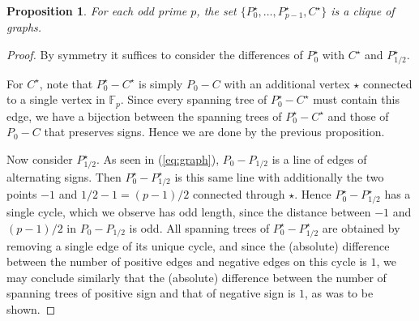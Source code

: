 \documentclass{amsart}
\theoremstyle{plain}
\newtheorem{proposition}[theorem]{Proposition}
\theoremstyle{definition}
\newcommand{\F}{\ensuremath{\mathbb{F}}}
\begin{document}
\begin{proposition}
	For each odd prime \(p\), the set \(\{P_0^\star,\dotsc,P_{p-1}^\star,C^\star\}\) is a clique of graphs.
\end{proposition}
\begin{proof}
	By symmetry it suffices to consider the differences of \(P_0^\star\) with \(C^\star\) and \(P_{1/2}^\star\).
	
	For \(C^\star\), note that \(P_0^\star-C^\star\) is simply \(P_0-C\) with an additional vertex \(\star\) connected to a single vertex in \(\F_p\).
	Since every spanning tree of \(P_0^\star-C^\star\) must contain this edge, we have a bijection between the spanning trees of \(P_0^\star-C^\star\) and those of \(P_0-C\) that preserves signs.
	Hence we are done by the previous proposition.
	
	Now consider \(P_{1/2}^\star\). 
	As seen in (\ref{eq:graph}), \(P_0-P_{1/2}\) is a line of edges of alternating signs. Then \(P_0^\star-P_{1/2}^\star\) is this same line with additionally the two points \(-1\) and \(1/2-1=(p-1)/2\) connected through \(\star\). 
	Hence \(P_0^\star-P_{1/2}^\star\) has a single cycle, which we observe has odd length, since the distance between \(-1\) and \((p-1)/2\) in \(P_0-P_{1/2}\) is odd.
	All spanning trees of \(P_0^\star-P_{1/2}^\star\) are obtained by removing a single edge of its unique cycle, and since the (absolute) difference between the number of positive edges and negative edges on this cycle is \(1\), we may conclude similarly that the (absolute) difference between the number of spanning trees of positive sign and that of negative sign is \(1\), as was to be shown.

\end{proof}
\end{document}
